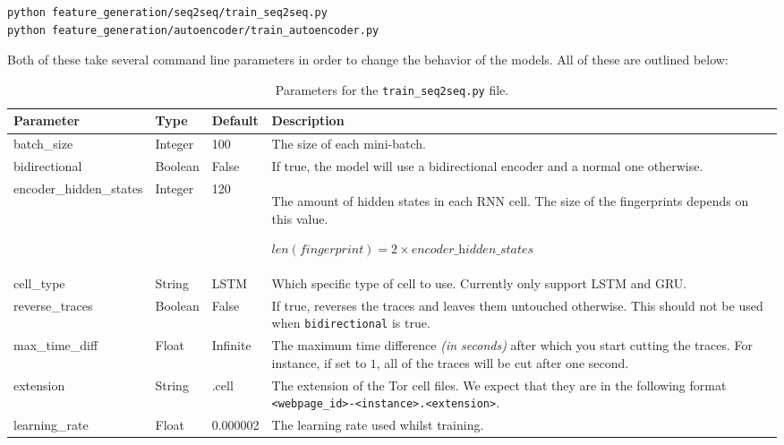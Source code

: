 \begin{lstlisting}[language=Bash]
python feature_generation/seq2seq/train_seq2seq.py
python feature_generation/autoencoder/train_autoencoder.py
\end{lstlisting}

Both of these take several command line parameters in order to change the behavior of the models.
All of these are outlined below:

\newpage

\begin{table}[ht]
  \centering
  \begin{tabular}{ l | l | l | p{} }
    \textbf{Parameter} & \textbf{Type} & \textbf{Default} & \textbf{Description} \\ \hline \hline
    batch\_size & Integer & 100 & The size of each mini-batch. \\ \hline
    bidirectional & Boolean & False & If true, the model will use a bidirectional encoder and a normal one otherwise. \\ \hline
    encoder\_hidden\_states & Integer & 120 & The amount of hidden states in each RNN cell. The size of the fingerprints depends on this value. \par $\textit{len}(\textit{fingerprint}) = 2 \times \textit{encoder\_hidden\_states}$ \\ \hline
    cell\_type & String & LSTM & Which specific type of cell to use. Currently only support LSTM and GRU. \\ \hline
    reverse\_traces & Boolean & False & If true, reverses the traces and leaves them untouched otherwise. This should not be used when \texttt{bidirectional} is true. \\ \hline
    max\_time\_diff & Float & Infinite & The maximum time difference \textit{(in seconds)} after which you start cutting the traces. For instance, if set to $1$, all of the traces will be cut after one second.\\ \hline
    extension & String & .cell & The extension of the Tor cell files. We expect that they are in the following format \texttt{<webpage\_id>-<instance>.<extension>}. \\ \hline
    learning\_rate & Float & 0.000002 & The learning rate used whilst training.
  \end{tabular}
  \caption{Parameters for the \texttt{train\_seq2seq.py} file.}
\end{table}

